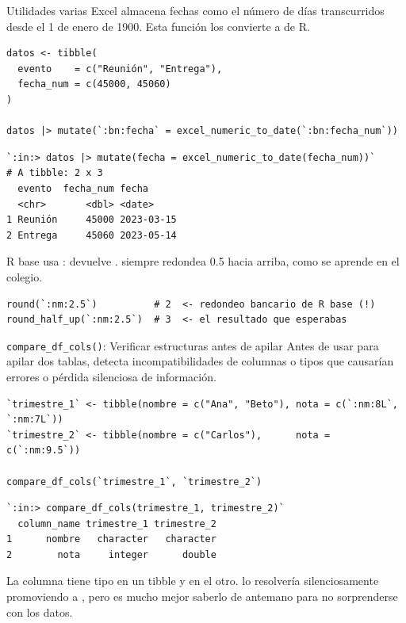\documentclass[8pt]{beamer}
\begin{document}
	\begin{frame}[fragile]{Utilidades varias}
		Excel almacena fechas como el número de días transcurridos desde el 1 de enero de 1900. Esta función los convierte a  de R.

\begin{lstlisting}[style=RScript]
datos <- tibble(
  evento    = c("Reunión", "Entrega"),
  fecha_num = c(45000, 45060)
)

datos |> mutate(`:bn:fecha` = excel_numeric_to_date(`:bn:fecha_num`))
\end{lstlisting}
\begin{lstlisting}[style=RConsole]
`:in:> datos |> mutate(fecha = excel_numeric_to_date(fecha_num))`
# A tibble: 2 x 3
  evento  fecha_num fecha
  <chr>       <dbl> <date>
1 Reunión     45000 2023-03-15
2 Entrega     45060 2023-05-14
\end{lstlisting}

		R base usa :  devuelve .  siempre redondea 0.5 hacia arriba, como se aprende en el colegio.

\begin{lstlisting}[style=RScript]
round(`:nm:2.5`)          # 2  <- redondeo bancario de R base (!)
round_half_up(`:nm:2.5`)  # 3  <- el resultado que esperabas
\end{lstlisting}
	\end{frame}


	\begin{frame}[fragile]{\texttt{compare\_df\_cols()}: Verificar estructuras antes de apilar}
		Antes de usar  para apilar dos tablas,  detecta incompatibilidades de columnas o tipos que causarían errores o pérdida silenciosa de información.

\begin{lstlisting}[style=RScript]
`trimestre_1` <- tibble(nombre = c("Ana", "Beto"), nota = c(`:nm:8L`, `:nm:7L`))
`trimestre_2` <- tibble(nombre = c("Carlos"),      nota = c(`:nm:9.5`))

compare_df_cols(`trimestre_1`, `trimestre_2`)
\end{lstlisting}
\begin{lstlisting}[style=RConsole]
`:in:> compare_df_cols(trimestre_1, trimestre_2)`
  column_name trimestre_1 trimestre_2
1      nombre   character   character
2        nota     integer      double
\end{lstlisting}

		\begin{alertblock}{}
			La columna  tiene tipo  en un tibble y  en el otro.  lo resolvería silenciosamente promoviendo a , pero es mucho mejor saberlo de antemano para no sorprenderse con los datos.
		\end{alertblock}
	\end{frame}
\end{document}

